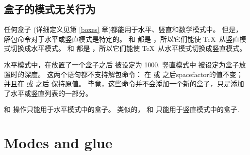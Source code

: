 \documentclass{book}
\begin{document}
\subsection{盒子的模式无关行为}

任何盒子  (详细定义见第 \ref{boxes} 章)都能用于水平、竖直和数学模式中。
但是，解包命令对于水平或竖直模式是特定的。
 和  都是 ，所以它们能使 \TeX\ 从竖直模式切换成水平模式。
 和  都是 ，所以它们能使 \TeX\ 从水平模式切换成竖直模式。

水平模式中，在放置了一个盒子之后  被设定为 1000.
竖直模式中  被设定为盒子放置时的深度。
这两个语句都不支持解包命令：
在  或  之后spacefactor的值不变；
并且在  或  之后  保持原值。
毕竟，这些命令并不会添加一个新的盒子，只是添加了水平或竖直列表的一部分。

 和  操作只能用于水平模式中的盒子。
类似的， 和  只能用于竖直模式中的盒子.


\section{Modes and glue}
\end{document}
